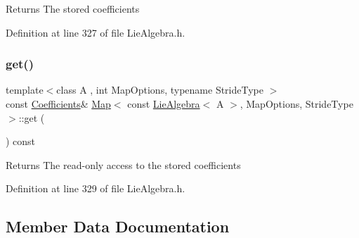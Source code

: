 \begin{DoxyReturn}{Returns}
The stored coefficients 
\end{DoxyReturn}


Definition at line 327 of file Lie\+Algebra.\+h.

\hypertarget{class_map_3_01const_01_lie_algebra_3_01_a_01_4_00_01_map_options_00_01_stride_type_01_4_ac521a54ebd19e30bf20d0a48ea0dce12}{}\label{class_map_3_01const_01_lie_algebra_3_01_a_01_4_00_01_map_options_00_01_stride_type_01_4_ac521a54ebd19e30bf20d0a48ea0dce12} 
\subsubsection{\texorpdfstring{get()}{get()}\hspace{0.1cm}{\footnotesize\ttfamily [2/2]}}
{\footnotesize\ttfamily template$<$class A , int Map\+Options, typename Stride\+Type $>$ \\
const \hyperlink{class_map_3_01const_01_lie_algebra_3_01_a_01_4_00_01_map_options_00_01_stride_type_01_4_a3173cdb7a49ee8a41f26cb0891740634}{Coefficients}\& \hyperlink{class_map_3_01const_01_lie_algebra_3_01_a_01_4_00_01_map_options_00_01_stride_type_01_4_a1f3c2cd540feb372191254760225bf1a}{Map}$<$ const \hyperlink{class_lie_algebra}{Lie\+Algebra}$<$ A $>$, Map\+Options, Stride\+Type $>$\+::get (\begin{DoxyParamCaption}{ }\end{DoxyParamCaption}) const\hspace{0.3cm}{\ttfamily [inline]}}

\begin{DoxyReturn}{Returns}
The read-\/only access to the stored coefficients 
\end{DoxyReturn}


Definition at line 329 of file Lie\+Algebra.\+h.



\subsection{Member Data Documentation}
\hypertarget{class_map_3_01const_01_lie_algebra_3_01_a_01_4_00_01_map_options_00_01_stride_type_01_4_a43cc2f5492ebc7467e491b72e61642bb}{}\label{class_map_3_01const_01_lie_algebra_3_01_a_01_4_00_01_map_options_00_01_stride_type_01_4_a43cc2f5492ebc7467e491b72e61642bb} 
